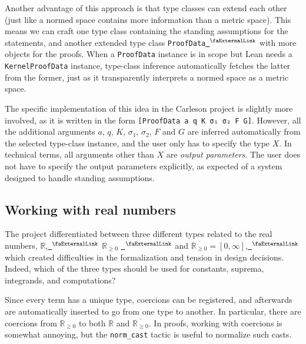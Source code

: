 \documentclass[12pt, reqno]{amsart}
\let\lean\lstinline
\newcommand*{\real}{\mathbb{R}} %
\newcommand{\nnreal}{\real_{\ge0}}
\newcommand{\ennreal}{\overline{\real_{\ge0}}}
\newcommand{\extlink}{~\ensuremath{{}^\text{\faExternalLink}}}
\theoremstyle{definition}
\theoremstyle{plain}
\begin{document}
Another advantage of this approach is that type classes can extend each other
(just like a normed space contains more information than a metric space).
This means we can craft one type class containing the standing assumptions for
the statements, and another extended type class \lean{ProofData}\href{https://github.com/fpvandoorn/carleson/blob/AFM-frozen/Carleson/ProofData.lean#L20-L36}{\extlink} with more
objects for the proofs. When a \lean{ProofData} instance is in scope but
Lean needs a \lean{KernelProofData} instance, type-class inference
automatically fetches the latter from the former, just as it transparently
interprets a normed space as a metric space.

The specific implementation of this idea in the Carleson project is slightly
more involved, as it is written in the form \lean{[ProofData a q K σ₁ σ₂ F G]}. However, all the additional arguments $a$, $q$, $K$, $\sigma_1$,
$\sigma_2$, $F$ and $G$ are inferred automatically from the selected type-class instance, and the user only has to specify the type $X$. In
technical terms, all arguments other than $X$ are \emph{output parameters}.
The user does not have to specify the output parameters explicitly,
as expected of a system designed to
handle standing assumptions.


\subsection{Working with real numbers}\label{subsec:real}

The project differentiated between three different types related to the real numbers, $\real$,\href{https://github.com/leanprover-community/mathlib4/blob/b63493a4746b4651fceb3bcf3a4651cc36a4b8de/Mathlib/Data/Real/Basic.lean#L36-L38}{\extlink} $\nnreal$ \href{https://github.com/leanprover-community/mathlib4/blob/b63493a4746b4651fceb3bcf3a4651cc36a4b8de/Mathlib/Data/NNReal/Defs.lean#L58}{\extlink}
and $\ennreal=[0,\infty]$,\href{https://github.com/leanprover-community/mathlib4/blob/b63493a4746b4651fceb3bcf3a4651cc36a4b8de/Mathlib/Data/ENNReal/Basic.lean#L101}{\extlink}
which created difficulties in the formalization
and tension in design decisions.
Indeed, which of the three types should be used for constants,
suprema, integrands, and computations?

Since every term has a unique type, coercions can be registered,
and afterwards are automatically inserted to go from one type to another. In particular, there are coercions from $\nnreal$ to both $\real$ and $\ennreal$.
In proofs, working with coercions is somewhat annoying, but the \texttt{norm\_cast} tactic is useful to normalize such casts.
\end{document}
